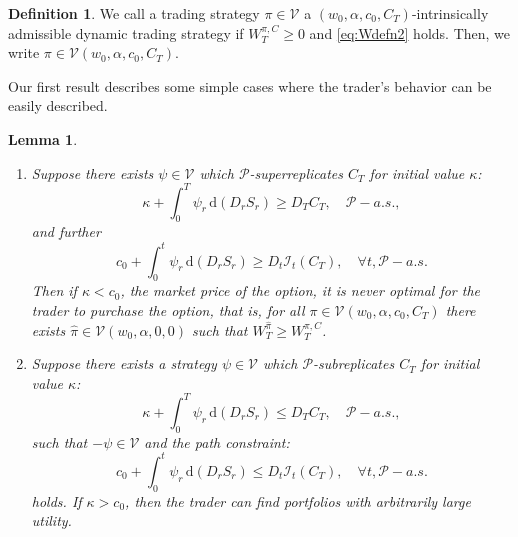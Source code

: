 \documentclass[a4paper]{amsart}
\newtheorem{lemma}[theorem]{Lemma}
\theoremstyle{definition}
\newtheorem{definition}[theorem]{Definition}
\theoremstyle{remark}
\numberwithin{equation}{section}
\newcommand{\di}{\mathrm{d}}
\newcommand{\as}{a.s.}
\newcommand{\Pc}{\mathcal{P}}
\newcommand{\Vc}{\mathcal{V}}
\newcommand{\In}{\mathcal{I}} %
\begin{document}
\begin{definition}\label{def:admissset}
  We call a trading strategy $\pi\in \Vc$ a $(w_0, \alpha, c_0,C_T)$-intrinsically admissible dynamic trading strategy if $W_T^{\pi,C}\geq 0$ and \eqref{eq:Wdefn2} holds. Then, we write $\pi \in \Vc(w_0,\alpha,c_0,C_T)$.
\end{definition}

Our first result describes some simple cases where the trader's behavior can be easily described.

\begin{lemma}\label{lem:BasicHedging}
  \begin{enumerate}
  \item\label{item:4} Suppose there exists $\psi \in \Vc$ which $\Pc$-superreplicates $C_T$ for initial value $\kappa$:
    \begin{equation*}
      \kappa + \int_0^T \psi_r \, \di (D_r S_r) \ge D_T C_T, \quad \Pc-\as{},
    \end{equation*}
    and further
    \begin{equation}\label{eq:1}
      c_0 + \int_0^t \psi_r \, \di (D_r S_r) \ge D_t \In_t(C_T), \quad \forall t, \Pc-\as{}
    \end{equation}
    Then if $\kappa < c_0$, the market price of the option, it is never optimal for the trader to purchase the option, that is, for all $\pi \in \Vc(w_0,\alpha,c_0,C_T)$ there exists $\hat{\pi} \in \Vc(w_0,\alpha, 0,0)$ such that $W_T^{\hat{\pi}} \ge W_T^{\pi,C}$.
  \item\label{item:5} Suppose there exists a strategy $\psi \in \Vc$ which $\Pc$-subreplicates $C_T$ for initial value $\kappa$:
    \begin{equation*}
      \kappa + \int_0^T \psi_r \, \di (D_r S_r) \le D_T C_T, \quad \Pc-\as{},
    \end{equation*}
    such that $-\psi\in \Vc$ and  the path constraint:
    \begin{equation*}
      c_0 +  \int_0^t \psi_r \, \di (D_r S_r) \le D_t \In_t(C_T),  \quad \forall t, \Pc-\as{}
    \end{equation*}
    holds.  If $\kappa > c_0$, then the trader can find portfolios with arbitrarily large utility.
  \end{enumerate}
\end{lemma}
\end{document}
